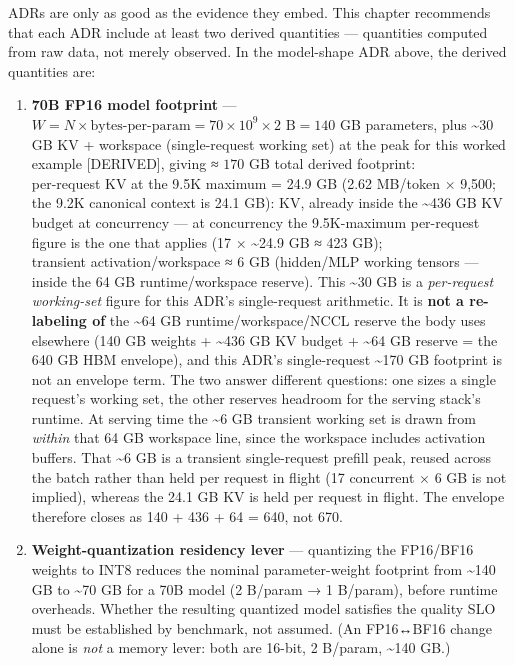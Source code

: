 \label{measurement}


ADRs are only as good as the evidence they embed. This chapter
recommends that each ADR include at least two derived quantities ---
quantities computed from raw data, not merely observed. In the
model-shape ADR above, the derived quantities are:

\begin{enumerate}
\def\labelenumi{\arabic{enumi}.}
\tightlist
\item
  \textbf{70B FP16 model footprint} ---
  \(W = N \times \text{bytes-per-param} = 70 \times 10^9 \times 2 \text{ B} = 140\)
  GB parameters, plus \textasciitilde30 GB KV + workspace
  (single-request working set) at the peak for this worked example
  \mbox{{[}DERIVED{]}}, giving ≈ \(170\) GB total derived footprint:\\
  per-request KV at the 9.5K maximum = 24.9 GB (2.62 MB/token × 9,500;
  the 9.2K canonical context is 24.1 GB): KV, already inside the
  \textasciitilde436 GB KV budget at concurrency --- at concurrency the
  9.5K-maximum per-request figure is the one that applies (17 ×
  \textasciitilde24.9 GB ≈ 423 GB);\\
  transient activation/workspace ≈ 6 GB (hidden/MLP working tensors ---
  inside the 64 GB runtime/workspace reserve). This \textasciitilde30 GB
  is a \emph{per-request working-set} figure for this ADR's
  single-request arithmetic. It is \textbf{not a re-labeling of} the
  \textasciitilde64 GB runtime/workspace/NCCL reserve the body uses
  elsewhere (140 GB weights + \textasciitilde436 GB KV budget +
  \textasciitilde64 GB reserve = the 640 GB HBM envelope), and this
  ADR's single-request \textasciitilde170 GB footprint is not an
  envelope term. The two answer different questions: one sizes a single
  request's working set, the other reserves headroom for the serving
  stack's runtime. At serving time the \textasciitilde6 GB transient
  working set is drawn from \emph{within} that 64 GB workspace line,
  since the workspace includes activation buffers. That \textasciitilde6
  GB is a transient single-request prefill peak, reused across the batch
  rather than held per request in flight (17 concurrent × 6 GB is not
  implied), whereas the 24.1 GB KV is held per request in flight. The
  envelope therefore closes as 140 + 436 + 64 = 640, not 670.
\item
  \textbf{Weight-quantization residency lever} --- quantizing the
  FP16/BF16 weights to INT8 reduces the nominal parameter-weight
  footprint from \textasciitilde140 GB to \textasciitilde70 GB for a 70B
  model (2 B/param → 1 B/param), before runtime overheads. Whether the
  resulting quantized model satisfies the quality SLO must be
  established by benchmark, not assumed. (An FP16↔BF16 change alone is
  \emph{not} a memory lever: both are 16-bit, 2 B/param,
  \textasciitilde140 GB.)
\end{enumerate}

